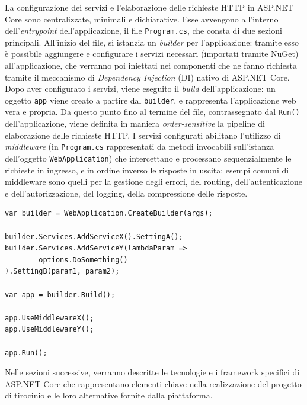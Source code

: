 La configurazione dei servizi e l'elaborazione delle richieste HTTP in ASP.NET Core sono centralizzate, minimali e dichiarative. Esse avvengono all'interno dell'\emph{entrypoint} dell'applicazione, il file \texttt{Program.cs},
che consta di due sezioni principali. All'inizio del file, si istanzia un \emph{builder} per l'applicazione: tramite esso è possibile aggiungere e configurare i servizi necessari (importati tramite NuGet) all'applicazione, che verranno poi iniettati nei componenti che ne fanno richiesta tramite il meccanismo di \emph{Dependency Injection} (DI) nativo di ASP.NET Core.
Dopo aver configurato i servizi, viene eseguito il \emph{build} dell'applicazione: un oggetto \texttt{app} viene creato a partire dal \texttt{builder}, e rappresenta l'applicazione web vera e propria.
Da questo punto fino al termine del file, contrassegnato dal \texttt{Run()} dell'applicazione, viene definita in maniera \emph{order-sensitive} la pipeline di elaborazione delle richieste HTTP. I servizi configurati abilitano l'utilizzo di \emph{middleware} (in \texttt{Program.cs} rappresentati da metodi invocabili sull'istanza dell'oggetto \texttt{WebApplication}) che intercettano e processano sequenzialmente le richieste in ingresso, e in ordine inverso le risposte in uscita: esempi comuni di middleware sono quelli per la gestione degli errori, del routing, dell'autenticazione e dell'autorizzazione, del logging, della compressione delle risposte.

\begin{lstlisting}[language={[Sharp]C}, caption={[Esempio Program.cs]Esempio di struttura di un file \texttt{Program.cs} in un progetto ASP.NET Core.}, label=lst:programcs]
var builder = WebApplication.CreateBuilder(args);

builder.Services.AddServiceX().SettingA();
builder.Services.AddServiceY(lambdaParam =>
        options.DoSomething()
).SettingB(param1, param2);

var app = builder.Build();

app.UseMiddlewareX();
app.UseMiddlewareY();

app.Run();
\end{lstlisting}
Nelle sezioni successive, verranno descritte le tecnologie e i framework specifici di ASP.NET Core che rappresentano elementi chiave nella realizzazione del progetto di tirocinio e le loro alternative fornite dalla piattaforma.

